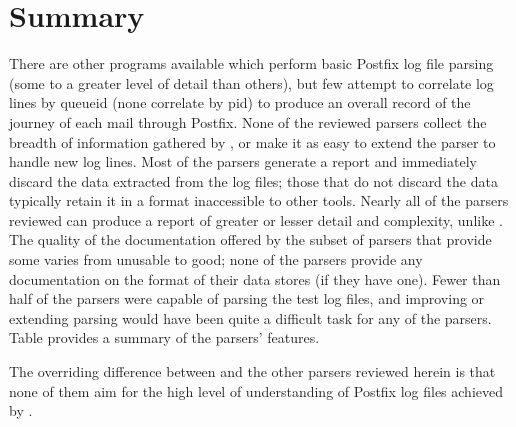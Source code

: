 \section{Summary}

There are other programs available which perform basic Postfix log file
parsing (some to a greater level of detail than others), but few attempt to
correlate log lines by queueid (none correlate by \gls{pid}) to produce an
overall record of the journey of each mail through Postfix.  None of the
reviewed parsers collect the breadth of information gathered by
\parsername{}, or make it as easy to extend the parser to handle new log
lines.  Most of the parsers generate a report and immediately discard the
data extracted from the log files; those that do not discard the data
typically retain it in a format inaccessible to other tools.  Nearly all of
the parsers reviewed can produce a report of greater or lesser detail and
complexity, unlike \parsername{}.  The quality of the documentation offered
by the subset of parsers that provide some varies from unusable to good;
none of the parsers provide any documentation on the format of their data
stores (if they have one).  Fewer than half of the parsers were capable of
parsing the \numberOFlogFILES{} test log files, and improving or extending
parsing would have been quite a difficult task for any of the parsers.
Table  provides a summary of the
parsers' features.

The overriding difference between \parsername{} and the other parsers
reviewed herein is that none of them aim for the high level of
understanding of Postfix log files achieved by \parsername{}.


